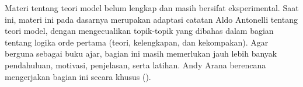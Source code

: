 \documentclass[../../include/open-logic-part]{subfiles}
\begin{document}

\begin{editorial}
  Materi tentang teori model belum lengkap dan masih bersifat
  eksperimental. Saat ini, materi ini pada dasarnya merupakan adaptasi
  catatan Aldo Antonelli tentang teori model, dengan mengecualikan
  topik-topik yang dibahas dalam bagian tentang logika orde pertama
  (teori, kelengkapan, dan kekompakan). Agar berguna sebagai buku ajar,
  bagian ini masih memerlukan jauh lebih banyak pendahuluan, motivasi,
  penjelasan, serta latihan. Andy Arana berencana mengerjakan bagian ini
  secara khusus ().
\end{editorial}





\OLEndPartHook
\end{document}

